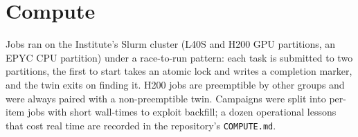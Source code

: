 \section{Compute}

Jobs ran on the Institute's Slurm cluster (L40S and H200 GPU partitions, an EPYC CPU partition) under a race-to-run pattern: each task is submitted to two partitions, the first to start takes an atomic lock and writes a completion marker, and the twin exits on finding it. H200 jobs are preemptible by other groups and were always paired with a non-preemptible twin. Campaigns were split into per-item jobs with short wall-times to exploit backfill; a dozen operational lessons that cost real time are recorded in the repository's \texttt{COMPUTE.md}.
